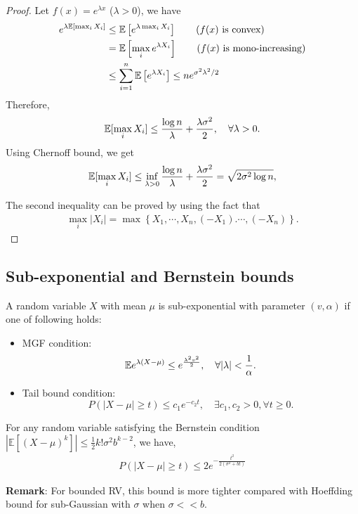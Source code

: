 \begin{proof}
Let $f(x) = e^{\lambda x}$ ($\lambda > 0$), we have
	\begin{align*}
		e^{\lambda \mathbb{E}[\max_i X_i]} & \leq \mathbb{E}\left[ e^{\lambda \max_i X_i} \right] \qquad (f(x) \text{ is convex})\\
		& = \mathbb{E}\left[ \max_i e^{\lambda X_i} \right] \qquad (f(x) \text{ is mono-increasing}) \\
		& \leq \sum_{i=1}^n \mathbb{E}\left[ e^{\lambda X_i} \right] \leq n e^{\sigma^2 \lambda^2 / 2} 
	\end{align*}
	Therefore, 
	\begin{align*}
		\mathbb{E}[\max_i X_i] \leq \frac{\log n}{\lambda} + \frac{\lambda \sigma^2}{2}, \quad \forall \lambda > 0.
	\end{align*}
	Using Chernoff bound, we get
	\begin{align*}
		\mathbb{E}[\max_i X_i] \leq \inf_{\lambda>0} \frac{\log n}{\lambda} + \frac{\lambda \sigma^2}{2}  = \sqrt{2\sigma^{2} \log n},
	\end{align*}

The second inequality can be proved by using the fact that
	\begin{align*}
		\max_i |X_i| = \max \left\{ X_1, \cdots, X_n, (-X_1). \cdots, (-X_n) \right\}.
	\end{align*}
\end{proof}

\subsection{Sub-exponential and Bernstein bounds}
\begin{definition} A random variable $X$ with mean $\mu$ is sub-exponential with parameter $(v, \alpha)$ if one of following holds:
\begin{itemize}
\setlength{\itemsep}{-0.5em}
    \item MGF condition: $$\mathbb{E}{e^{\lambda (X - \mu)} \leq e^{\frac{\lambda^2 v^2}{2}}}, \quad \forall |\lambda| < \frac{1}{\alpha}.$$
    \item Tail bound condition: $$P(|X - \mu| \geq t) \leq c_1 e^{-c_2 t}, \quad \exists c_1, c_2 > 0, \forall t \geq 0.$$
\end{itemize}
\end{definition}

\begin{theorem}For any random variable satisfying the Bernstein condition $\left|\mathbb{E}\left[(X-\mu)^{k}\right]\right| \leq \frac{1}{2} k ! \sigma^{2} b^{k-2}$, we have,
\begin{align*}
    P(|X-\mu| \geq t) \leq 2 e^{-\frac{t^{2}}{2\left(\sigma^{2}+b t\right)}}
\end{align*}
\end{theorem}
\textbf{Remark}: For bounded RV, this bound is more tighter compared with Hoeffding bound for sub-Gaussian with $\sigma$ when $\sigma << b$.

